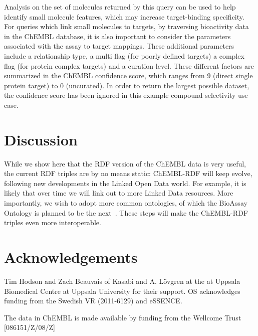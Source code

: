 \documentclass[sw]{iosart2c}
\begin{document}
Analysis on the set of molecules returned by this query can be used to help identify small 
molecule features, which may increase target-binding specificity. For queries which link 
small molecules to targets, by traversing bioactivity data in the ChEMBL database, it is 
also important to consider the parameters associated with the assay to target mappings. 
These additional parameters include a relationship type, a multi flag (for poorly defined
targets) a complex flag (for protein complex targets) and a curation level. These different 
factors are summarized in the ChEMBL confidence score, which ranges from 9 (direct single 
protein target) to 0 (uncurated). In order to return the largest possible dataset, the 
confidence score has been ignored in this example compound selectivity use case.

\section{Discussion}

While we show here that the RDF version of the ChEMBL data is very useful, the current RDF triples are by no means static: ChEMBL-RDF
will keep evolve, following new developments in the Linked Open Data world. For example, it is likely that over time we will link out
to more Linked Data resources. More importantly, we wish to adopt more common ontologies, of which the BioAssay Ontology is planned
to be the next~\cite{Visser2011}. These steps will make the ChEMBL-RDF triples even more interoperable.

\section{Acknowledgements}

Tim Hodson and Zach Beauvais of Kasabi and A. L\"ovgren at the at Uppsala Biomedical Centre at Uppsala University for their
support. OS acknowledges funding from the Swedish VR (2011-6129) and eSSENCE.

The data in ChEMBL is made available by funding from the Wellcome Trust [086151/Z/08/Z]



%
%
%
\end{document}
